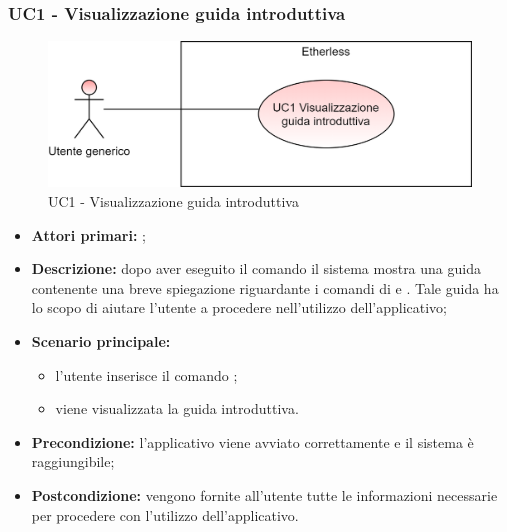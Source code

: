 \subsubsection{UC1 - Visualizzazione guida introduttiva}
	\begin{figure}[h]
		\centering
		\includegraphics[scale=\ucs]{./res/img/UC1G.png}
		\caption {UC1 - Visualizzazione guida introduttiva}
	\end{figure}
	\begin{itemize}
		\item \textbf{Attori primari:} \ug{};
		\item \textbf{Descrizione:} dopo aver eseguito il comando \init{} il sistema mostra una guida contenente una breve spiegazione riguardante i comandi di \login{} e \signup{}. Tale guida ha lo scopo di aiutare l'utente a procedere nell'utilizzo dell'applicativo; 
		\item \textbf{Scenario principale:} 
		\begin{itemize}
			\item l’utente inserisce il comando \init{};
			\item viene visualizzata la guida introduttiva.
		\end{itemize}
		\item \textbf{Precondizione:} l'applicativo viene avviato correttamente e il sistema è raggiungibile;
		\item \textbf{Postcondizione:} vengono fornite all'utente tutte le informazioni necessarie per procedere con l'utilizzo dell'applicativo. 
	\end{itemize}